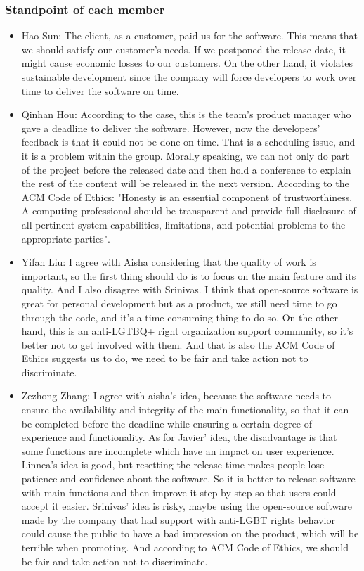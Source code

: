 		\subsubsection{Standpoint of each member}
		\begin{itemize}
  			\item Hao Sun: The client, as a customer, paid us for the software. This means that we should satisfy our customer's needs. If we postponed the release date, it might cause economic losses to our customers. On the other hand, it violates sustainable development since the company will force developers to work over time to deliver the software on time. 
  			\item Qinhan Hou: According to the case, this is the team's product manager who gave a deadline to deliver the software. However, now the developers' feedback is that it could not be done on time. That is a scheduling issue, and it is a problem within the group. Morally speaking, we can not only do part of the project before the released date and then hold a conference to explain the rest of the content will be released in the next version. According to the ACM Code of Ethics: "Honesty is an essential component of trustworthiness. A computing professional should be transparent and provide full disclosure of all pertinent system capabilities, limitations, and potential problems to the appropriate parties".
  			\item Yifan Liu: I agree with Aisha considering that the quality of work is important, so the first thing should do is to focus on the main feature and its quality. And I also disagree with Srinivas. I think that open-source software is great for personal development but as a product, we still need time to go through the code, and it's a time-consuming thing to do so. On the other hand, this is an anti-LGTBQ+ right organization support community, so it's better not to get involved with them. 
  			And that is also the ACM Code of Ethics suggests us to do, we need to be fair and take action not to discriminate.
  			\item Zezhong Zhang: I agree with aisha's idea, because the software needs to ensure the availability and integrity of the main functionality, so that it can be completed before the deadline while ensuring a certain degree of experience and functionality. As for Javier' idea, the disadvantage is that some functions are incomplete which have an impact on user experience. Linnea's idea is good, but resetting the release time makes people lose patience and confidence about the software. So it is better to release software with main functions and then improve it step by step so that users could accept it easier. Srinivas' idea is risky, maybe using the open-source software made by the company that had support with anti-LGBT rights behavior could cause the public to have a bad impression on the product, which will be terrible when promoting. And according to ACM Code of Ethics, we should be fair and take action not to discriminate.
		\end{itemize}
